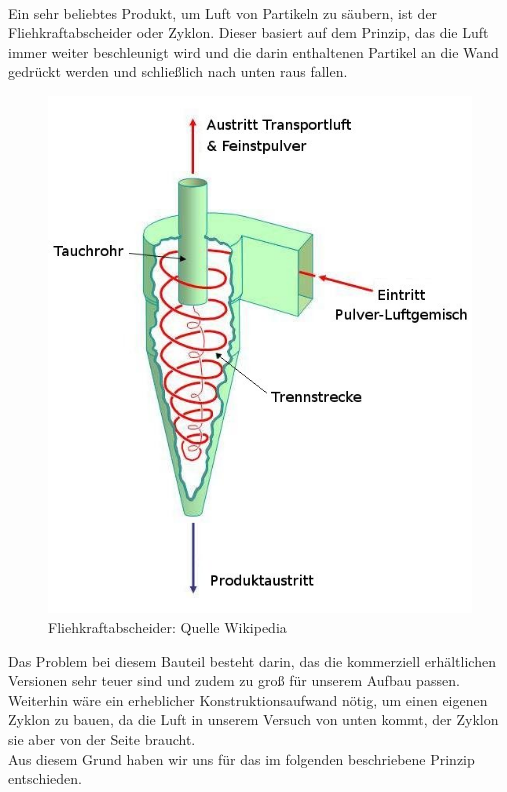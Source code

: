 \hfill \\

Ein sehr beliebtes Produkt, um Luft von Partikeln zu säubern, ist der Fliehkraftabscheider oder Zyklon. Dieser basiert auf dem Prinzip, das die Luft immer weiter beschleunigt wird und die darin enthaltenen Partikel an die Wand gedrückt werden und schließlich nach unten raus fallen. \\


\begin{figure}[h]
	\begin{center}
		\includegraphics[scale=0.4]{Umsetzung_Fliehkraftabscheider.jpg}
		\caption{Fliehkraftabscheider: Quelle Wikipedia}
	\end{center}
\end{figure}



Das Problem bei diesem Bauteil besteht darin, das die kommerziell erhältlichen Versionen sehr teuer sind und zudem zu groß für unserem Aufbau passen. \\
Weiterhin wäre ein erheblicher Konstruktionsaufwand nötig, um einen eigenen Zyklon zu bauen, da die Luft in unserem Versuch von unten kommt, der Zyklon sie aber von der Seite braucht. \\
Aus diesem Grund haben wir uns für das im folgenden beschriebene Prinzip entschieden.



